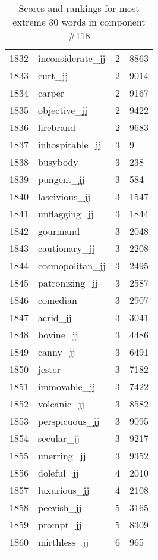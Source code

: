 \begin{longtable}[!htbp]{| rlr@{.}l |}
    1832 & inconsiderate\_jj & 2 & 8863 \\
    1833 & curt\_jj & 2 & 9014 \\
    1834 & carper & 2 & 9167 \\
    1835 & objective\_jj & 2 & 9422 \\
    1836 & firebrand & 2 & 9683 \\
    1837 & inhospitable\_jj & 3 & 9 \\
    1838 & busybody & 3 & 238 \\
    1839 & pungent\_jj & 3 & 584 \\
    1840 & lascivious\_jj & 3 & 1547 \\
    1841 & unflagging\_jj & 3 & 1844 \\
    1842 & gourmand & 3 & 2048 \\
    1843 & cautionary\_jj & 3 & 2208 \\
    1844 & cosmopolitan\_jj & 3 & 2495 \\
    1845 & patronizing\_jj & 3 & 2587 \\
    1846 & comedian & 3 & 2907 \\
    1847 & acrid\_jj & 3 & 3041 \\
    1848 & bovine\_jj & 3 & 4486 \\
    1849 & canny\_jj & 3 & 6491 \\
    1850 & jester & 3 & 7182 \\
    1851 & immovable\_jj & 3 & 7422 \\
    1852 & volcanic\_jj & 3 & 8582 \\
    1853 & perspicuous\_jj & 3 & 9095 \\
    1854 & secular\_jj & 3 & 9217 \\
    1855 & unerring\_jj & 3 & 9352 \\
    1856 & doleful\_jj & 4 & 2010 \\
    1857 & luxurious\_jj & 4 & 2108 \\
    1858 & peevish\_jj & 5 & 3165 \\
    1859 & prompt\_jj & 5 & 8309 \\
    1860 & mirthless\_jj & 6 & 965 \\
    \hline
    \caption{Scores and rankings for most extreme 30 words in component \#118} \\
\end{longtable}
